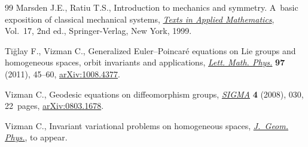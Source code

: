 \documentclass[10pt,a4paper]{amsart}
\numberwithin{equation}{section}
\begin{document}
\begin{thebibliography}{99}
Marsden J.E., Ratiu T.S., Introduction to mechanics and symmetry. A~basic
  exposition of classical mecha\-ni\-cal systems, \href{http://dx.doi.org/10.1007/978-0-387-21792-5}{\textit{Texts in Applied
  Mathematics}}, Vol.~17, 2nd ed., Springer-Verlag, New York, 1999.

Ti{\u{g}}lay F., Vizman C., Generalized {E}uler--{P}oincar\'e equations on
  {L}ie groups and homogeneous spaces, orbit invariants and applications,
  \href{http://dx.doi.org/10.1007/s11005-011-0464-2}{\textit{Lett. Math. Phys.}} \textbf{97} (2011), 45--60, \href{http://arxiv.org/abs/1008.4377}{arXiv:1008.4377}.

Vizman C., Geodesic equations on dif\/feomorphism groups, \href{http://dx.doi.org/10.3842/SIGMA.2008.030}{\textit{SIGMA}}
  \textbf{4} (2008), 030, 22~pages, \href{http://arxiv.org/abs/0803.1678}{arXiv:0803.1678}.

Vizman C., Invariant variational problems on homogeneous spaces,
  \href{http://dx.doi.org/10.1016/j.geomphys.2014.10.012}{\textit{J.~Geom. Phys.}}, {t}o appear.

\end{thebibliography}
\end{document}
